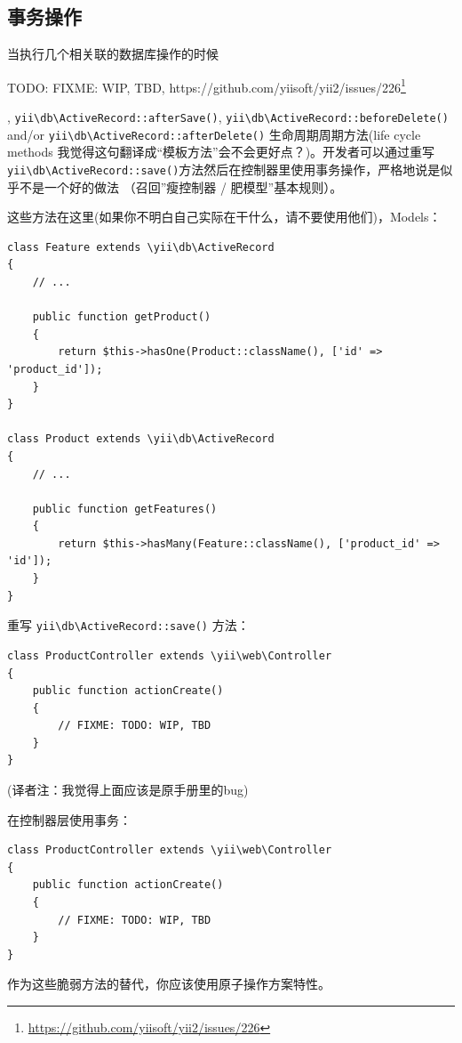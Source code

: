 \subsection{事务操作}
当执行几个相关联的数据库操作的时候

TODO: FIXME: WIP, TBD, https://github.com/yiisoft/yii2/issues/226\footnote{\url{https://github.com/yiisoft/yii2/issues/226}}

, \texttt{yii{\allowbreak{}\textbackslash}db{\allowbreak{}\textbackslash}ActiveRecord\allowbreak{}::\allowbreak{}afterSave()}, \texttt{yii{\allowbreak{}\textbackslash}db{\allowbreak{}\textbackslash}ActiveRecord\allowbreak{}::\allowbreak{}beforeDelete()} and/or \texttt{yii{\allowbreak{}\textbackslash}db{\allowbreak{}\textbackslash}ActiveRecord\allowbreak{}::\allowbreak{}afterDelete()} 生命周期周期方法(life cycle methods 我觉得这句翻译成“模板方法”会不会更好点？)。开发者可以通过重写\texttt{yii{\allowbreak{}\textbackslash}db{\allowbreak{}\textbackslash}ActiveRecord\allowbreak{}::\allowbreak{}save()}方法然后在控制器里使用事务操作，严格地说是似乎不是一个好的做法 （召回''瘦控制器 / 肥模型''基本规则）。

这些方法在这里(如果你不明白自己实际在干什么，请不要使用他们)，Models：

\lstset{language=php}\begin{lstlisting}
class Feature extends \yii\db\ActiveRecord
{
    // ...

    public function getProduct()
    {
        return $this->hasOne(Product::className(), ['id' => 'product_id']);
    }
}

class Product extends \yii\db\ActiveRecord
{
    // ...

    public function getFeatures()
    {
        return $this->hasMany(Feature::className(), ['product_id' => 'id']);
    }
}
\end{lstlisting}
重写 \texttt{yii{\allowbreak{}\textbackslash}db{\allowbreak{}\textbackslash}ActiveRecord\allowbreak{}::\allowbreak{}save()} 方法：

\lstset{language=php}\begin{lstlisting}
class ProductController extends \yii\web\Controller
{
    public function actionCreate()
    {
        // FIXME: TODO: WIP, TBD
    }
}
\end{lstlisting}
(译者注：我觉得上面应该是原手册里的bug)

在控制器层使用事务：

\lstset{language=php}\begin{lstlisting}
class ProductController extends \yii\web\Controller
{
    public function actionCreate()
    {
        // FIXME: TODO: WIP, TBD
    }
}
\end{lstlisting}
作为这些脆弱方法的替代，你应该使用原子操作方案特性。

